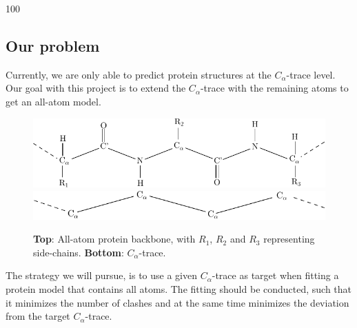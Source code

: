 \documentclass[a0,portrait]{a0poster}
\begin{document}
\begin{GridBlock}{0}{21}{100}
\begin{multicols}{3}



\section{Our problem}
Currently, we are only able to predict protein structures at the $C_\alpha$-trace level. 
Our goal with this project is to extend the $C_\alpha$-trace with the remaining atoms to get an all-atom model.


\begin{figure}
  \centering
  \vspace{1cm}
  \includegraphics[width=0.48\columnwidth]{../rapport/figures/amino_connect}  
  \\[1cm]
  \includegraphics[width=0.48\columnwidth]{../rapport/figures/Calpha_backbone}
  \label{fig:amino_connect}
  \caption{\textbf{Top}: All-atom protein backbone, with $R_1$, $R_2$ and $R_3$ representing side-chains. \textbf{Bottom}: $C_{\alpha}$-trace. }
\end{figure}

The strategy we will pursue, is to use a given $C_\alpha$-trace as target when fitting a
protein model that contains all atoms. The fitting should be conducted,
such that it minimizes the number of clashes and at the same time
minimizes the deviation from the target $C_\alpha$-trace.


\end{multicols}
\end{GridBlock}
\end{document}
